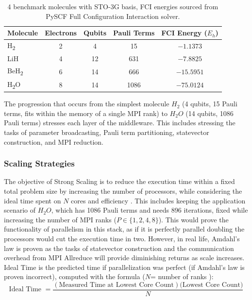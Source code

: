 \begin{table}[htbp]
\centering
\renewcommand{\arraystretch}{1.2}
\begin{tabular}{|l|c|c|c|c|}
\hline
\textbf{Molecule} & \textbf{Electrons} & \textbf{Qubits} & \textbf{Pauli Terms} & \textbf{FCI Energy ($E_h$)} \\ \hline
H\textsubscript{2} & 2  & 4  & 15   & $-1.1373$ \\ \hline
LiH & 4  & 12 & 631  & $-7.8825$ \\ \hline
BeH\textsubscript{2}  & 6  & 14 & 666  & $-15.5951$ \\ \hline
H\textsubscript{2}O & 8  & 14 & 1086 & $-75.0124$ \\ \hline
\end{tabular}   
\caption{4 benchmark molecules with STO-3G basis, FCI energies sourced from PySCF Full Configuration Interaction solver.}
\label{table:molecules}
\end{table}   

The progression that occurs from the simplest molecule $H_2$ (4 qubits, 15 Pauli terms, fits within the memory of a single MPI 
rank) to $H_{2}O$ (14 qubits, 1086 Pauli terms) \parencite{kandala2017hardware} stresses each layer of the middleware. This includes stressing the tasks of parameter broadcasting, 
Pauli term partitioning, statevector construction, and MPI reduction. 

\subsubsection{Scaling Strategies}
The objective of Strong Scaling is to reduce the execution time within a fixed total problem size by increasing the 
number of processors, while considering the ideal time spent on $N$ cores and efficiency \parencite{amdahl1967validity}. This includes 
keeping the application scenario of $H_{2}O$, which has 1086 Pauli terms and needs 896 iterations, fixed while increasing the number of MPI ranks ($P \in \{1,2,4,8\}$). This would prove the functionality of parallelism in this stack, as if it is perfectly
parallel doubling the processors would cut the execution time in two. However, in real life, Amdahl's law is proven as the tasks of statevector construction and the communication overhead from MPI Allreduce will provide diminishing returns as scale increases. 
Ideal Time is the predicted time if parallelization was perfect (if Amdahl's law is proven incorrect), computed with the formula ($N$= number of ranks \parencite{cuboulderScaling}): 
\begin{equation}
    \text {Ideal Time } = \frac{(\text{Measured Time at Lowest Core Count})\text{(Lowest Core Count)}}{N}
\end{equation}

